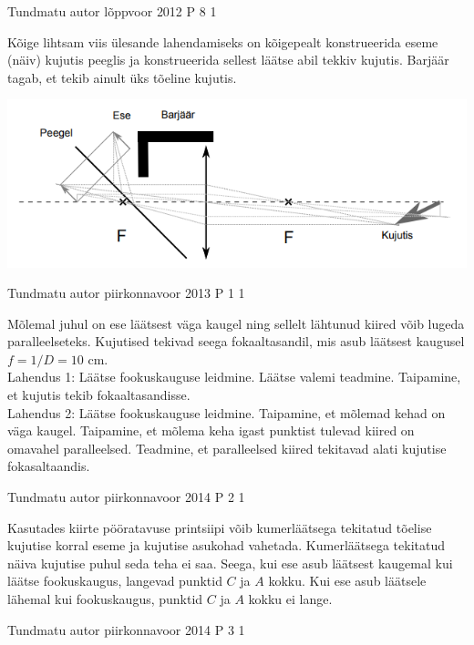 \documentclass[11pt]{article}
\begin{document}
{%
{Tundmatu autor} %
{lõppvoor} %
{2012} %
{P 8} %
{1} %
{

\ifSolution
Kõige lihtsam viis ülesande lahendamiseks on kõigepealt konstrueerida eseme (näiv) kujutis peeglis ja konstrueerida sellest läätse abil tekkiv kujutis. Barjäär tagab, et tekib ainult üks tõeline kujutis.
\begin{center}
	\includegraphics[width=0.5\linewidth]{2012-v3p-08-lah.PNG}
\end{center}
\fi
}


{Tundmatu autor} %
{piirkonnavoor} %
{2013} %
{P 1} %
{1} %
{

\ifSolution
Mõlemal juhul on ese läätsest väga kaugel ning sellelt lähtunud kiired võib lugeda paralleelseteks. Kujutised tekivad seega fokaaltasandil, mis asub läätsest kaugusel $f = 1/D = 10$ cm. \\
Lahendus 1: Läätse fookuskauguse leidmine. Läätse valemi teadmine. Taipamine, et kujutis tekib fokaaltasandisse.\\
Lahendus 2: Läätse fookuskauguse leidmine. Taipamine, et mõlemad kehad on väga kaugel. Taipamine, et mõlema keha igast punktist tulevad kiired on omavahel paralleelsed. Teadmine, et paralleelsed kiired tekitavad alati kujutise fokasaltaandis.
\fi
}
 


{Tundmatu autor} %
{piirkonnavoor} %
{2014} %
{P 2} %
{1} %
{

\ifSolution
Kasutades kiirte pööratavuse printsiipi võib kumerläätsega tekitatud tõelise kujutise korral eseme ja kujutise asukohad vahetada. Kumerläätsega tekitatud näiva kujutise puhul seda teha ei saa. Seega, kui ese asub läätsest kaugemal kui läätse fookuskaugus, langevad punktid $C$ ja $A$ kokku. Kui ese asub läätsele lähemal kui fookuskaugus, punktid $C$ ja $A$ kokku ei lange.
\fi
}


{Tundmatu autor} %
{piirkonnavoor} %
{2014} %
{P 3} %
{1} %
{

}}
\end{document}
